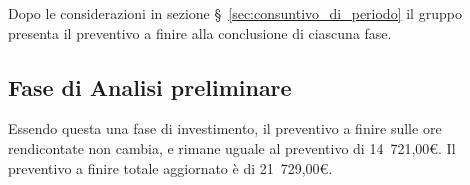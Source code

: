 \documentclass[../piano-di-progetto.tex]{subfiles}
\begin{document}
Dopo le considerazioni in sezione §~\ref{sec:consuntivo_di_periodo} il gruppo presenta il preventivo a finire alla conclusione di ciascuna fase.
\subsection{Fase di Analisi preliminare}%
\label{sub:fase_di_analisi_preliminare}
Essendo questa una fase di investimento, il preventivo a finire sulle ore rendicontate non cambia, e rimane uguale al preventivo di 14~721,00€. Il preventivo a finire totale aggiornato è di 21~729,00€.
\end{document}
